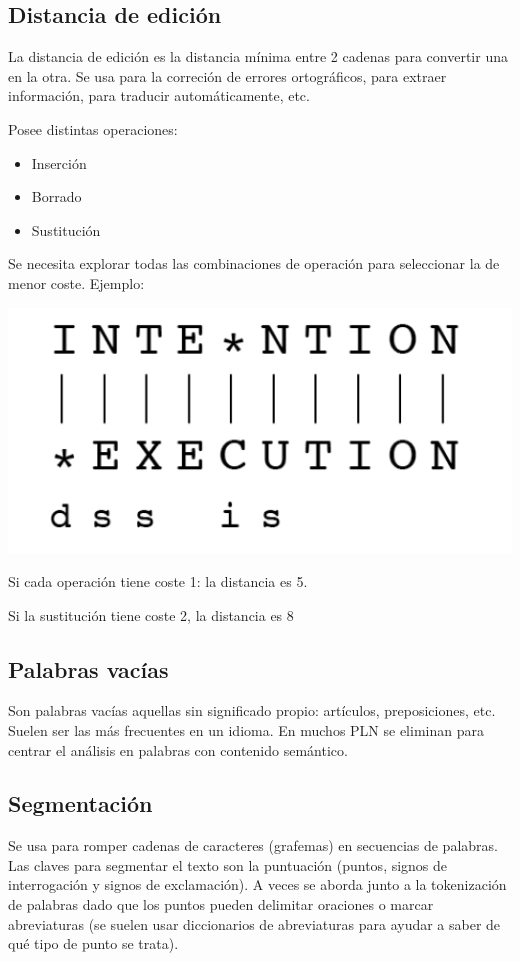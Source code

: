 \documentclass{ctexart}
\begin{document}
	\subsection{Distancia de edición}
	\begin{flushleft}
		La distancia de edición es la distancia mínima entre 2 cadenas para convertir una en la otra. Se usa para la correción de errores ortográficos, para extraer información, para traducir automáticamente, etc. \par 
		Posee distintas operaciones:
		\begin{itemize}
			\item Inserción
			\item Borrado
			\item Sustitución
		\end{itemize}
		Se necesita explorar todas las combinaciones de	operación para seleccionar la de menor coste. Ejemplo: \par
		\includegraphics[scale=0.5]{dedicion} \par
		Si cada operación tiene coste 1: la distancia es 5. \par
		Si la sustitución tiene coste 2, la distancia es 8
	\end{flushleft}
	\subsection{Palabras vacías}
	\begin{flushleft}
		Son palabras vacías aquellas sin significado propio: artículos, preposiciones, etc. Suelen ser las más frecuentes en un idioma. En muchos PLN se eliminan para centrar el análisis en palabras con contenido semántico.
	\end{flushleft}
	\subsection{Segmentación}
	\begin{flushleft}
		Se usa para romper cadenas de caracteres (grafemas) en secuencias de palabras.  Las claves para segmentar el texto son la puntuación (puntos, signos de interrogación y signos de exclamación). A veces se aborda junto
		a la tokenización de palabras dado que los puntos pueden delimitar oraciones o marcar abreviaturas (se suelen usar diccionarios de abreviaturas para ayudar a saber de qué tipo de punto se trata).
	\end{flushleft}
\end{document}
